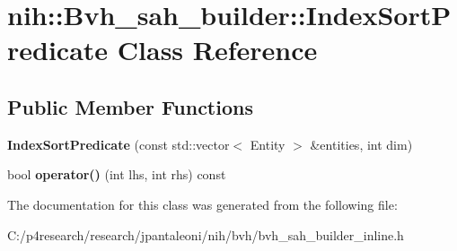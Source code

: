 \hypertarget{classnih_1_1_bvh__sah__builder_1_1_index_sort_predicate}{
\section{nih\-:\-:\-Bvh\-\_\-sah\-\_\-builder\-:\-:\-Index\-Sort\-Predicate \-Class \-Reference}
\label{classnih_1_1_bvh__sah__builder_1_1_index_sort_predicate}
}
\subsection*{\-Public \-Member \-Functions}
\begin{DoxyCompactItemize}
\item 
\hypertarget{classnih_1_1_bvh__sah__builder_1_1_index_sort_predicate_abf33cce16216d1e829c1080a9b9361ca}{
{\bfseries \-Index\-Sort\-Predicate} (const std\-::vector$<$ \-Entity $>$ \&entities, int dim)}
\label{classnih_1_1_bvh__sah__builder_1_1_index_sort_predicate_abf33cce16216d1e829c1080a9b9361ca}

\item 
\hypertarget{classnih_1_1_bvh__sah__builder_1_1_index_sort_predicate_a959f516bc6bda99bf356fa9f70442baa}{
bool {\bfseries operator()} (int lhs, int rhs) const }
\label{classnih_1_1_bvh__sah__builder_1_1_index_sort_predicate_a959f516bc6bda99bf356fa9f70442baa}

\end{DoxyCompactItemize}


\-The documentation for this class was generated from the following file\-:\begin{DoxyCompactItemize}
\item 
\-C\-:/p4research/research/jpantaleoni/nih/bvh/bvh\-\_\-sah\-\_\-builder\-\_\-inline.\-h\end{DoxyCompactItemize}
